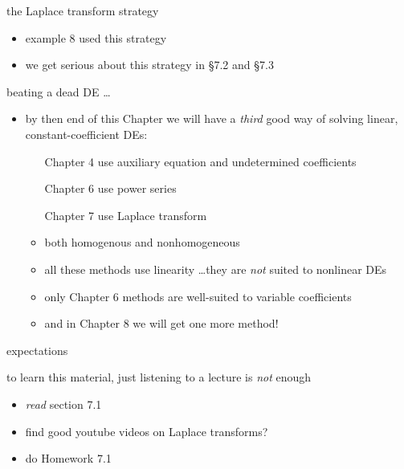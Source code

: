 \documentclass[dvipsnames,colorlinks]{beamer}
\begin{document}
\begin{frame}{the Laplace transform strategy}

\begin{center}
\end{center}

\begin{itemize}
\item example 8 used this strategy
\item we get serious about this strategy in \S 7.2 and \S 7.3
\end{itemize}
\end{frame}


\begin{frame}{beating a dead DE \dots}

\begin{itemize}
\item by then end of this Chapter we will have a \emph{third} good way of solving linear, constant-coefficient DEs:
     \begin{itemize}
     \item[Chapter 4] use auxiliary equation and undetermined coefficients
     \item[Chapter 6] use power series
     \item[Chapter 7] use Laplace transform

\bigskip
     \item both homogenous and nonhomogeneous
     \item all these methods use linearity \dots they are \emph{not} suited to nonlinear DEs
     \item only Chapter 6 methods are well-suited to variable coefficients
     \item and in Chapter 8 we will get one more method!
     \end{itemize}
\end{itemize}
\end{frame}


\begin{frame}{expectations}

to learn this material, just listening to a lecture is \emph{not} enough
     \begin{itemize}
     \item \emph{read} section 7.1
     \item find good youtube videos on Laplace transforms?
     \item do Homework 7.1
     \end{itemize}
\end{frame}
\end{document}
